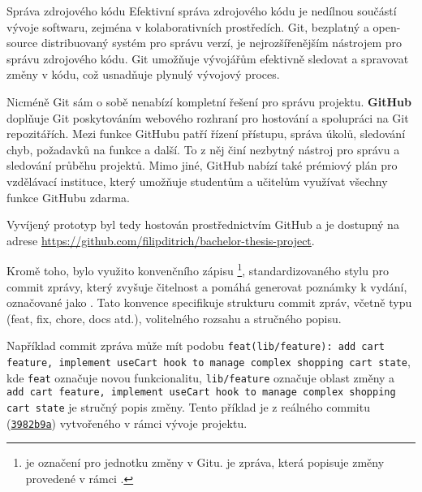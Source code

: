 \begin{subsection}{Správa zdrojového kódu}
    \label{subsec:implementace-sprava-zdrojoveho-kodu}
    Efektivní správa zdrojového kódu je nedílnou součástí vývoje softwaru, zejména v kolaborativních prostředích.
    Git, bezplatný a open-source distribuovaný systém pro správu verzí, je nejrozšířenějším nástrojem pro správu zdrojového kódu.
    Git umožňuje vývojářům efektivně sledovat a spravovat změny v kódu, což usnadňuje plynulý vývojový proces\cite{g__git_scm_com}.

    Nicméně Git sám o sobě nenabízí kompletní řešení pro správu projektu.
    \textbf{GitHub} doplňuje Git poskytováním webového rozhraní pro hostování a spolupráci na Git repozitářích.
    Mezi funkce GitHubu patří řízení přístupu, správa úkolů, sledování chyb, požadavků na funkce a další\cite{g_github_com_about}.
    To z něj činí nezbytný nástroj pro správu a sledování průběhu projektů.
    Mimo jiné, GitHub nabízí také prémiový plán pro vzdělávací instituce, který umožňuje studentům a učitelům využívat všechny funkce GitHubu zdarma\cite{e_education_github_com_pack}.

    Vyvíjený prototyp byl tedy hostován prostřednictvím GitHub a je dostupný na adrese \url{https://github.com/filipditrich/bachelor-thesis-project}.

    Kromě toho, bylo využito konvenčního zápisu \footnote{ je označení pro jednotku změny v Gitu.  je zpráva, která popisuje změny provedené v rámci .}, standardizovaného stylu pro commit zprávy, který zvyšuje čitelnost a pomáhá generovat poznámky k vydání, označované jako .
    Tato konvence specifikuje strukturu commit zpráv, včetně typu (feat, fix, chore, docs atd.), volitelného rozsahu a stručného popisu.

    Například commit zpráva může mít podobu \texttt{feat(lib/feature): add cart feature, implement useCart hook to manage complex shopping cart state}, kde \texttt{feat} označuje novou funkcionalitu, \texttt{lib/feature} označuje oblast změny a \texttt{add cart feature, implement useCart hook to manage complex shopping cart state} je stručný popis změny.
    Tento příklad je z reálného commitu (\texttt{\href{https://github.com/filipditrich/bachelor-thesis-project/commit/3982b9a}{3982b9a}}) vytvořeného v rámci vývoje projektu.
\end{subsection}
